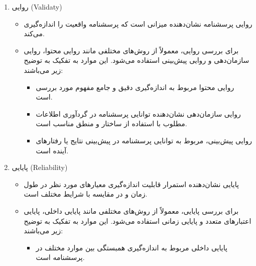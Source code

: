 \documentclass[a4paper,10pt]{article}
\begin{document}
    \begin{enumerate}
        
        \item روایی (Validaty)
        
        \begin{itemize}
            
            \item روایی پرسشنامه نشان‌دهنده میزانی است که پرسشنامه واقعیت را اندازه‌گیری می‌کند.

            \item برای بررسی روایی، معمولاً از روش‌های مختلفی مانند روایی محتوا، روایی سازمان‌دهی و روایی پیش‌بینی استفاده می‌شود. این موارد به تفکیک به توضیح زیر می‌باشند:
            
            \begin{itemize}
                
                \item روایی محتوا مربوط به اندازه‌گیری دقیق و جامع مفهوم مورد بررسی است.

                \item روایی سازمان‌دهی نشان‌دهنده توانایی پرسشنامه در گردآوری اطلاعات مطلوب با استفاده از ساختار و منطق مناسب است.
    
                \item روایی پیش‌بینی، مربوط به توانایی پرسشنامه در پیش‌بینی نتایج یا رفتارهای آینده  است.

            \end{itemize}

        \end{itemize}

        \item پایایی (Reliability)

        \begin{itemize}
            
            \item پایایی نشان‌دهنده استمرار قابلیت اندازه‌گیری معیارهای مورد نظر در طول زمان و در مقایسه با شرایط مختلف است.
            
            \item برای بررسی پایایی، معمولاً از روش‌های مختلفی مانند پایایی داخلی، پایایی اعتبارهای متعدد و پایایی زمانی استفاده می‌شود. این موارد به تفکیک به توضیح زیر می‌باشند:
            
            \begin{itemize}
                
                \item پایایی داخلی مربوط به اندازه‌گیری همبستگی بین موارد مختلف در پرسشنامه است.


\end{itemize}
\end{itemize}
\end{enumerate}
\end{document}
